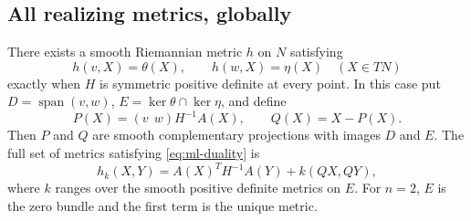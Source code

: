 \subsection{All realizing metrics, globally}
\begin{proposition}
\label{prop:ml-metric}
There exists a smooth Riemannian metric $h$ on $N$ satisfying
\begin{equation}\label{eq:ml-duality}
 h(v,X)=\theta(X),\qquad h(w,X)=\eta(X)\quad(X\in TN)
\end{equation}
exactly when $H$ is symmetric positive definite at every point. In this
case put $D=\operatorname{span}(v,w)$, $E=\ker\theta\cap\ker\eta$, and define
\begin{equation}\label{eq:ml-projection}
 P(X)=(v\ \ w)H^{-1}A(X),\qquad Q(X)=X-P(X).
\end{equation}
Then $P$ and $Q$ are smooth complementary projections with images $D$ and
$E$. The full set of metrics satisfying \eqref{eq:ml-duality} is
\begin{equation}\label{eq:ml-family}
 h_k(X,Y)=A(X)^TH^{-1}A(Y)+k(QX,QY),
\end{equation}
where $k$ ranges over the smooth positive definite metrics on $E$.
For $n=2$, $E$ is the zero bundle and the first term is the unique metric.
\end{proposition}
